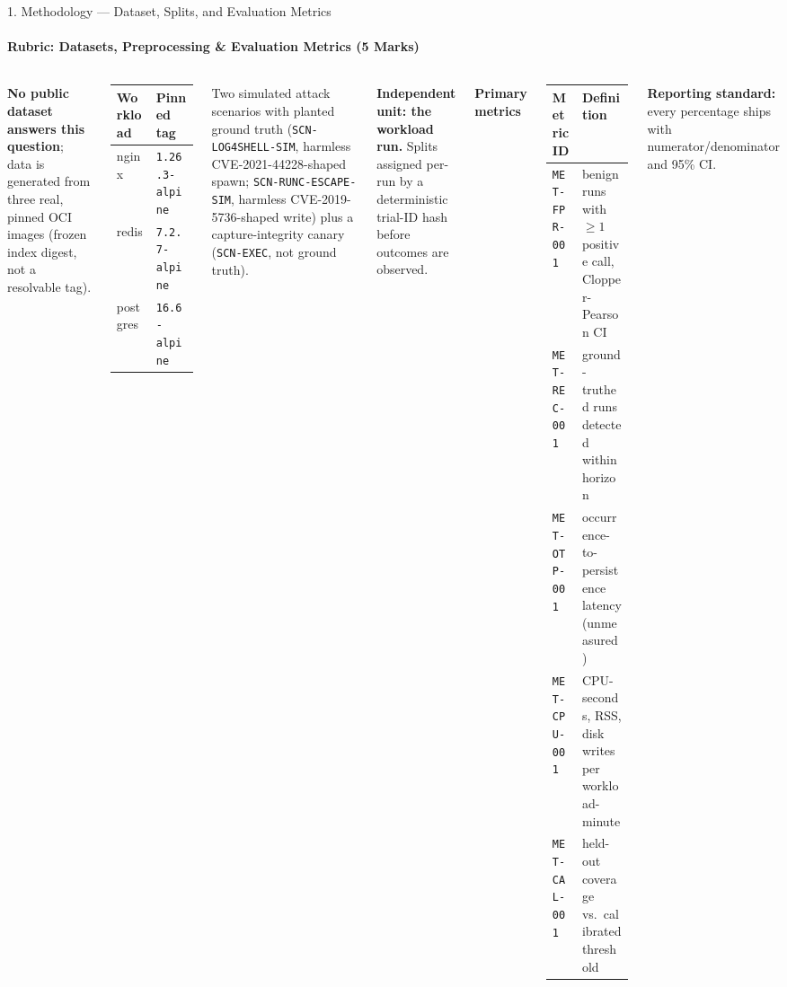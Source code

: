 \documentclass[aspectratio=169, 11pt]{beamer}
\begin{document}
\begin{frame}{1. Methodology --- Dataset, Splits, and Evaluation Metrics}
\framesubtitle{Rubric: Datasets, Preprocessing \& Evaluation Metrics (5 Marks)}

\begin{columns}[T]
\footnotesize
\textbf{No public dataset answers this question}; data is generated from
three real, pinned OCI images (frozen index digest, not a resolvable tag).

\smallskip
\begin{tabular}{@{}ll@{}}
\toprule
\textbf{Workload} & \textbf{Pinned tag} \\
\midrule
nginx & \texttt{1.26.3-alpine} \\
redis & \texttt{7.2.7-alpine} \\
postgres & \texttt{16.6-alpine} \\
\bottomrule
\end{tabular}

\smallskip
Two simulated attack scenarios with planted ground truth
(\texttt{SCN-LOG4SHELL-SIM}, harmless CVE-2021-44228-shaped spawn;
\texttt{SCN-RUNC-ESCAPE-SIM}, harmless CVE-2019-5736-shaped write) plus a
capture-integrity canary (\texttt{SCN-EXEC}, not ground truth).

\smallskip
\textbf{Independent unit: the workload run.} Splits assigned per-run by a
deterministic trial-ID hash before outcomes are observed.

\footnotesize
\textbf{Primary metrics}

\begin{tabular}{@{}p{2.5cm}p{4.4cm}@{}}
\toprule
\textbf{Metric ID} & \textbf{Definition} \\
\midrule
\texttt{MET-FPR-001} & benign runs with $\geq1$ positive call, Clopper-Pearson CI \\
\texttt{MET-REC-001} & ground-truthed runs detected within horizon \\
\texttt{MET-OTP-001} & occurrence-to-persistence latency (unmeasured) \\
\texttt{MET-CPU-001} & CPU-seconds, RSS, disk writes per workload-minute \\
\texttt{MET-CAL-001} & held-out coverage vs.\ calibrated threshold \\
\bottomrule
\end{tabular}

\smallskip
\textcolor{amritaMaroon}{\textbf{Reporting standard:}} every percentage
ships with numerator/denominator and 95\% CI.
\end{columns}
\end{frame}
\end{document}
